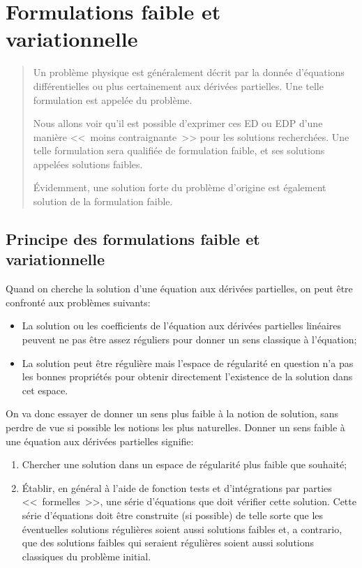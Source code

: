 \chapter{Formulations faible et variationnelle}\label{Ch_FFaible}
\begin{abstract}
Un problème physique est généralement décrit par la donnée
d'équations différentielles ou plus certainement aux dérivées partielles.
Une telle formulation est appelée  du problème.

Nous allons voir qu'il est possible d'exprimer ces ED ou EDP d'une manière
<<~moins contraignante~>> pour les solutions recherchées.
Une telle formulation sera qualifiée de formulation faible, et ses
solutions appelées solutions faibles.

Évidemment, une solution forte du problème d'origine est également solution de
la formulation faible.
\end{abstract}


\medskip
\section{Principe des formulations faible et variationnelle}
Quand on cherche la solution d'une équation aux dérivées partielles, on peut être confronté aux problèmes suivants:
\begin{itemize}
  \item La solution ou les coefficients de l'équation aux dérivées partielles linéaires peuvent ne pas être assez réguliers pour donner
	un sens classique à l'équation;
  \item La solution peut être régulière mais l'espace de régularité en question n'a pas les
	bonnes propriétés pour obtenir directement l'existence de la solution dans cet espace.
\end{itemize}


\medskip



On va donc essayer de donner un sens plus faible à la notion de solution, sans perdre de vue si
possible les notions les plus naturelles. Donner un sens faible à une équation aux dérivées partielles signifie:
\begin{enumerate}
  \item Chercher une solution dans un espace de régularité plus faible que souhaité;
  \item Établir, en général à l'aide de fonction tests et d'intégrations par parties <<~formelles~>>,
	une série d'équations que doit vérifier cette solution.
	Cette série d'équations doit être construite (si possible) de telle sorte que les éventuelles
	solutions régulières soient aussi solutions faibles et, a contrario, que des solutions faibles
	qui seraient régulières soient aussi solutions classiques du problème initial.
\end{enumerate}


